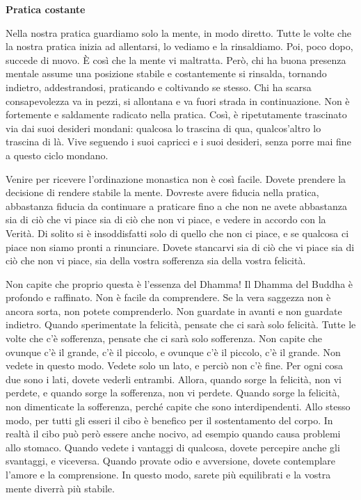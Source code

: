 \textbf{Pratica costante}

Nella nostra pratica guardiamo solo la mente, in modo diretto. Tutte le
volte che la nostra pratica inizia ad allentarsi, lo vediamo e la
rinsaldiamo. Poi, poco dopo, succede di nuovo. È così che la mente vi
maltratta. Però, chi ha buona presenza mentale assume una posizione
stabile e costantemente si rinsalda, tornando indietro, addestrandosi,
praticando e coltivando se stesso. Chi ha scarsa consapevolezza va in
pezzi, si allontana e va fuori strada in continuazione. Non è fortemente
e saldamente radicato nella pratica. Così, è ripetutamente trascinato
via dai suoi desideri mondani: qualcosa lo trascina di qua,
qualcos'altro lo trascina di là. Vive seguendo i suoi capricci e i suoi
desideri, senza porre mai fine a questo ciclo mondano.

Venire per ricevere l'ordinazione monastica non è così facile. Dovete
prendere la decisione di rendere stabile la mente. Dovreste avere
fiducia nella pratica, abbastanza fiducia da continuare a praticare fino
a che non ne avete abbastanza sia di ciò che vi piace sia di ciò che non
vi piace, e vedere in accordo con la Verità. Di solito si è
insoddisfatti solo di quello che non ci piace, e se qualcosa ci piace
non siamo pronti a rinunciare. Dovete stancarvi sia di ciò che vi piace
sia di ciò che non vi piace, sia della vostra sofferenza sia della
vostra felicità.

Non capite che proprio questa è l'essenza del Dhamma! Il Dhamma del
Buddha è profondo e raffinato. Non è facile da comprendere. Se la vera
saggezza non è ancora sorta, non potete comprenderlo. Non guardate in
avanti e non guardate indietro. Quando sperimentate la felicità, pensate
che ci sarà solo felicità. Tutte le volte che c'è sofferenza, pensate
che ci sarà solo sofferenza. Non capite che ovunque c'è il grande, c'è
il piccolo, e ovunque c'è il piccolo, c'è il grande. Non vedete in
questo modo. Vedete solo un lato, e perciò non c'è fine. Per ogni cosa
due sono i lati, dovete vederli entrambi. Allora, quando sorge la
felicità, non vi perdete, e quando sorge la sofferenza, non vi perdete.
Quando sorge la felicità, non dimenticate la sofferenza, perché capite
che sono interdipendenti. Allo stesso modo, per tutti gli esseri il cibo
è benefico per il sostentamento del corpo. In realtà il cibo può però
essere anche nocivo, ad esempio quando causa problemi allo stomaco.
Quando vedete i vantaggi di qualcosa, dovete percepire anche gli
svantaggi, e viceversa. Quando provate odio e avversione, dovete
contemplare l'amore e la comprensione. In questo modo, sarete più
equilibrati e la vostra mente diverrà più stabile.

